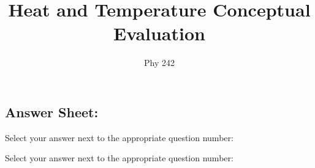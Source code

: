 \documentclass[
  letterpaper,
  english,
  pagemark,
  stamp,
  12pt,
  oneside,
]{sdaps}
\author{Phy 242}
\title{Heat and Temperature Conceptual Evaluation}
\begin{document}
  \begin{questionnaire}[noinfo]
      \begin{multicols}{2}
      \section{Answer Sheet:}
      \begin{choicegroup}{Select your answer next to the appropriate question number:}
    \end{choicegroup}

      \begin{choicegroup}{Select your answer next to the appropriate question number:}
 
      \end{choicegroup}
  \end{multicols}

  \end{questionnaire}
\end{document}
